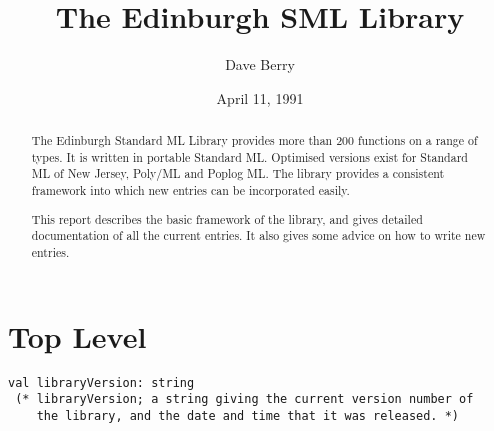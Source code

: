 %
%
%
%
%
%
%
%


\title{The Edinburgh SML Library}
\author{Dave Berry}
\date{April 11, 1991}



\maketitle

\begin{abstract}
The Edinburgh Standard ML Library provides more than 200 functions
on a range of types.  It is written in portable Standard ML.
Optimised versions exist for Standard ML of New Jersey, Poly/ML
and Poplog ML.  The library provides a consistent framework
into which new entries can be incorporated easily.

This report describes the basic framework of the library, and
gives detailed documentation of all the current entries.  It
also gives some advice on how to write new entries.
\end{abstract}

\tableofcontents









\section{Top Level}
\begin{verbatim}
val libraryVersion: string
 (* libraryVersion; a string giving the current version number of
    the library, and the date and time that it was released. *)
\end{verbatim}


